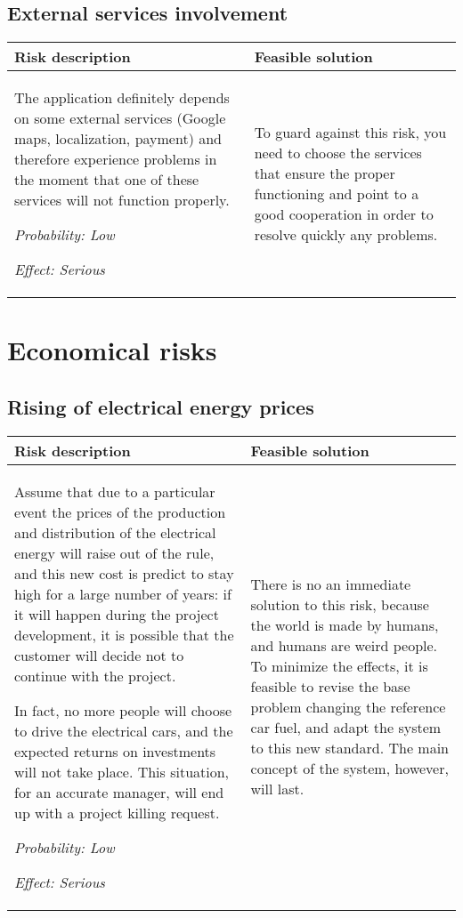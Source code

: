 \documentclass{scrreprt}
\begin{document}
\subsection{External services involvement}


\begin{center}
\begin{tabularx}{\columnwidth}{XX}
\toprule \textbf{Risk description} & \textbf{Feasible solution}\\
\midrule
The application definitely depends on some external services (Google maps, localization, payment) and therefore experience problems in the moment that one of these services will not function properly. 

\emph{Probability: Low } 

\emph{Effect: Serious}& To guard against this risk, you need to choose the services that ensure the proper functioning and point to a good cooperation in order to resolve quickly any problems.\\
\bottomrule
\end{tabularx}
\end{center}

\section{Economical risks}

\subsection{Rising of electrical energy prices}

\begin{center}
\begin{tabularx}{\columnwidth}{XX}
\toprule \textbf{Risk description} & \textbf{Feasible solution}\\
\midrule
Assume that due to a particular event the prices of the production and distribution of the electrical energy will raise out of the rule, and this new cost is predict to stay high for a large number of years: if it will happen during the project development, it is possible that the customer will decide not to continue with the project.

In fact, no more people will choose to drive the electrical cars, and the expected returns on investments will not take place. This situation, for an accurate manager, will end up with a project killing request.

\emph{Probability: Low } 

\emph{Effect: Serious}& There is no an immediate solution to this risk, because the world is made by humans, and humans are weird people. To minimize the effects, it is feasible to revise the base problem changing the reference car fuel, and adapt the system to this new standard. The main concept of the system, however, will last.\\
\bottomrule
\end{tabularx}
\end{center}
\end{document}
